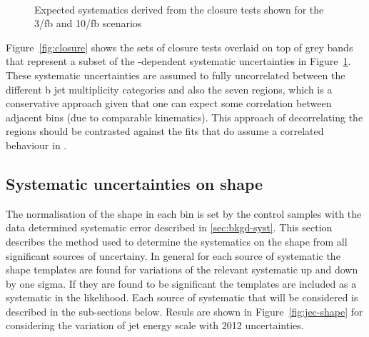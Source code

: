 \begin{figure}[]
  \centering
   ~~
  \caption{\label{fig:systematics} Expected systematics derived from the closure tests shown for
the 3/fb and 10/fb scenarios}
\end{figure}

Figure~\ref{fig:closure} shows the sets of closure tests overlaid on
top of grey bands that represent a subset of the \scalht-dependent systematic
uncertainties in Figure~\ref{fig:systematics}. These systematic
uncertainties are assumed to fully uncorrelated between the different
b jet multiplicity categories and also the seven \scalht regions,
which is a conservative approach given that one can expect some
correlation between adjacent \scalht bins (due to comparable
kinematics). This approach of decorrelating the \scalht regions
should be contrasted against the fits that do assume a correlated 
behaviour in \scalht.


\subsection{Systematic uncertainties on \mht shape \label{sec:syst-on-shape}}

The normalisation of the \mht shape in each \scalht bin is set by the control
samples with the data determined systematic error described in \ref{sec:bkgd-syst}.
This section describes the method used to determine the systematics on the shape
from all significant sources of uncertainy. In general for each source of systematic
the shape templates are found for variations of the relevant systematic up and down by 
one sigma. If they are found to be significant the templates are included as a systematic in the likelihood. 
Each source of systematic that will be considered is described in the sub-sections below. 
Resuls are shown in Figure~\ref{fig:jec-shape} for considering the variation of jet energy scale with 2012 uncertainties.

